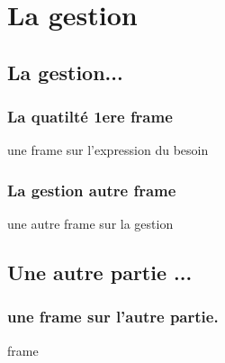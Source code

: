 \section{La gestion}
\subsection{La gestion...}
\begin{frame}
  \frametitle{\color{white} La quatilté 1ere frame}
  une frame sur l'expression du besoin
\end{frame}
\begin{frame}
  \frametitle{\color{white} La gestion autre frame}
  une autre frame sur la gestion
\end{frame}
\subsection{Une autre partie ...}
\begin{frame}
  \frametitle{\color{white} une frame sur l'autre partie.}
  frame
\end{frame}
